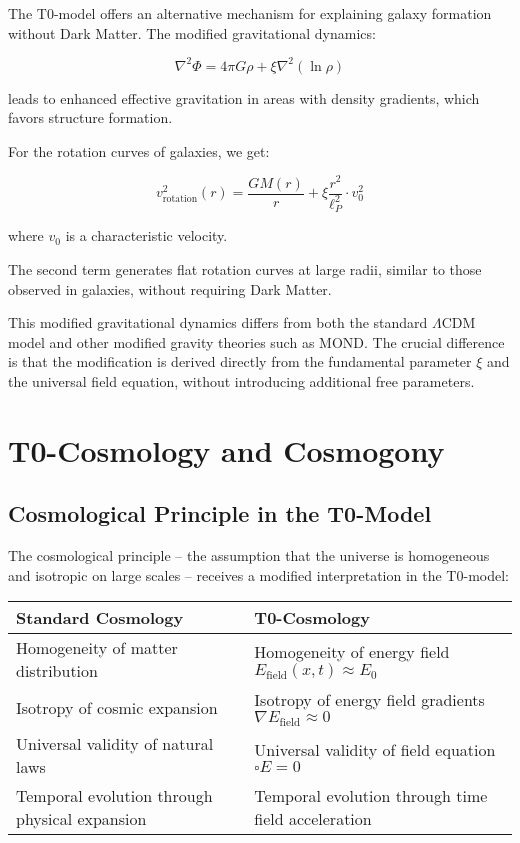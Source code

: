 \documentclass[12pt,a4paper]{article}
\theoremstyle{definition}
\begin{document}
	The T0-model offers an alternative mechanism for explaining galaxy formation without Dark Matter. The modified gravitational dynamics:
	
	\begin{equation}
		\nabla^2 \Phi = 4\pi G \rho + \xi \nabla^2 \left( \ln \rho \right)
	\end{equation}
	
	leads to enhanced effective gravitation in areas with density gradients, which favors structure formation.
	
	For the rotation curves of galaxies, we get:
	
	\begin{equation}
		v_{\text{rotation}}^2(r) = \frac{GM(r)}{r} + \xi \frac{r^2}{\ell_P^2} \cdot v_0^2
	\end{equation}
	
	where $v_0$ is a characteristic velocity.
	
	The second term generates flat rotation curves at large radii, similar to those observed in galaxies, without requiring Dark Matter.
	
	\begin{wichtig}
		This modified gravitational dynamics differs from both the standard $\Lambda$CDM model and other modified gravity theories such as MOND. The crucial difference is that the modification is derived directly from the fundamental parameter $\xi$ and the universal field equation, without introducing additional free parameters.
	\end{wichtig}
	
	\section{T0-Cosmology and Cosmogony}
	
	\subsection{Cosmological Principle in the T0-Model}
	
	The cosmological principle – the assumption that the universe is homogeneous and isotropic on large scales – receives a modified interpretation in the T0-model:
	
	\begin{center}
		\begin{tabular}{|p{7cm}|p{7cm}|}
			\hline
			\textbf{Standard Cosmology} & \textbf{T0-Cosmology} \\
			\hline
			Homogeneity of matter distribution & Homogeneity of energy field $E_{\text{field}}(x,t) \approx E_0$ \\
			\hline
			Isotropy of cosmic expansion & Isotropy of energy field gradients $\nabla E_{\text{field}} \approx 0$ \\
			\hline
			Universal validity of natural laws & Universal validity of field equation $\square E = 0$ \\
			\hline
			Temporal evolution through physical expansion & Temporal evolution through time field acceleration \\
			\hline
		\end{tabular}
	\end{center}
	
\end{document}
